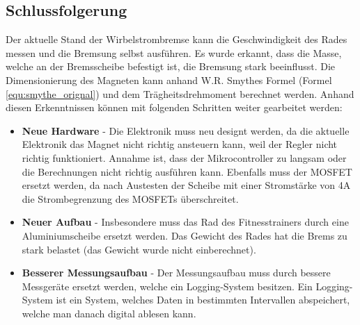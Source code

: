 \subsection{Schlussfolgerung}
Der aktuelle Stand der Wirbelstrombremse kann die Geschwindigkeit des Rades messen und die Bremsung selbst ausführen. Es wurde erkannt, dass die Masse, welche an der Bremsscheibe befestigt ist, die Bremsung stark beeinflusst. Die Dimensionierung des Magneten kann anhand W.R. Smythes Formel (Formel \ref{equ:smythe_orignal}) und dem Trägheitsdrehmoment berechnet werden.
\newpara
Anhand diesen Erkenntnissen können mit folgenden Schritten weiter gearbeitet werden:
\begin{itemize}
  \item \textbf{Neue Hardware} - Die Elektronik muss neu designt werden, da die aktuelle Elektronik das Magnet nicht richtig ansteuern kann, weil der Regler nicht richtig funktioniert. Annahme ist, dass der Mikrocontroller zu langsam oder die Berechnungen nicht richtig ausführen kann. Ebenfalls muss der MOSFET ersetzt werden, da nach Austesten der Scheibe mit einer Stromstärke von 4A die Strombegrenzung des MOSFETs überschreitet.
  \item \textbf{Neuer Aufbau} - Insbesondere muss das Rad des Fitnesstrainers durch eine Aluminiumscheibe ersetzt werden. Das Gewicht des Rades hat die Brems zu stark belastet (das Gewicht wurde nicht einberechnet).
  \item \textbf{Besserer Messungsaufbau} - Der Messungsaufbau muss durch bessere Messgeräte ersetzt werden, welche ein Logging-System besitzen. Ein Logging-System ist ein System, welches Daten in bestimmten Intervallen abspeichert, welche man danach digital ablesen kann.
\end{itemize}